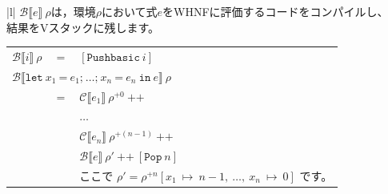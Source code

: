 \documentclass{jbook}
\begin{document}
\begin{tabular} {|l|} \hline
	$\mathcal{B} \llbracket e \rrbracket ~ \rho$は，環境$\rho$において式$e$をWHNFに評価するコードをコンパイルし、 \\
	結果をVスタックに残します。                                                                                   \\
	\begin{tabular}{r c l}
		$\mathcal{B} \llbracket i \rrbracket ~ \rho$                             & $=$ & $\left[\texttt{Pushbasic} ~ i \right]$                                                                                                                                                       \\
		\multicolumn{3}{l}{$\mathcal{B} \llbracket \texttt{let} ~ x_1 ~ \texttt{=} ~ e_1\texttt{;} ~  \ldots \texttt{;} ~ x_n ~ \texttt{=} ~ e_n ~ \texttt{in} ~ e \rrbracket ~ \rho$}                                                                                                \\
		                                                                         & $=$ & $\mathcal{C} \llbracket e_1 \rrbracket ~ \rho^{+0} ~ \texttt{++}$                                                                                                                            \\
		                                                                         &     & $\ldots$                                                                                                                                                                                     \\
		                                                                         &     & $\mathcal{C} \llbracket e_n \rrbracket ~ \rho^{+(n - 1)} ~ \texttt{++}$                                                                                                                      \\
		                                                                         &     & $\mathcal{B} \llbracket e \rrbracket ~ \rho' ~ \texttt{++} ~ \left[\texttt{Pop} ~ n\right]$                                                                                                  \\
		                                                                         &     & ここで $\rho' = \rho^{+n} \left[x_1 ~ \mapsto ~ n - 1, ~ \ldots , ~ x_n ~ \mapsto ~ 0\right]$ です。                                                                                         \\

\end{tabular}
\end{tabular}
\end{document}
